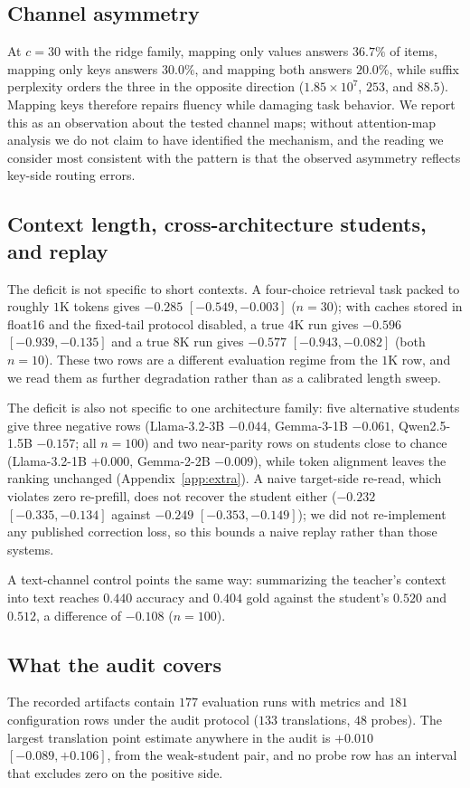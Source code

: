 \documentclass{article} %
\begin{document}
\subsection{Channel asymmetry}
At $c{=}30$ with the ridge family, mapping only values answers $36.7\%$ of
items, mapping only keys answers $30.0\%$, and mapping both answers $20.0\%$,
while suffix perplexity orders the three in the opposite direction
($1.85\times10^{7}$, $253$, and $88.5$). Mapping keys therefore repairs fluency
while damaging task behavior. We report this as an observation about the tested
channel maps; without attention-map analysis we do not claim to have identified
the mechanism, and the reading we consider most consistent with the pattern is
that the observed asymmetry reflects key-side routing errors.

\subsection{Context length, cross-architecture students, and replay}
The deficit is not specific to short contexts. A four-choice retrieval task
packed to roughly $1$K tokens gives $-0.285$ $[-0.549,-0.003]$ ($n{=}30$);
with caches stored in float16 and the fixed-tail protocol disabled, a true
$4$K run gives $-0.596$ $[-0.939,-0.135]$ and a true $8$K run gives $-0.577$
$[-0.943,-0.082]$ (both $n{=}10$). These two rows are a different evaluation
regime from the $1$K row, and we read them as further degradation rather than as
a calibrated length sweep.

The deficit is also not specific to one architecture family: five alternative
students give three negative rows (Llama-3.2-3B $-0.044$, Gemma-3-1B $-0.061$,
Qwen2.5-1.5B $-0.157$; all $n{=}100$) and two near-parity rows on students
close to chance (Llama-3.2-1B $+0.000$, Gemma-2-2B $-0.009$), while token
alignment leaves the ranking unchanged (Appendix~\ref{app:extra}). A naive
target-side re-read, which violates zero re-prefill, does not recover the
student either ($-0.232$ $[-0.335,-0.134]$ against $-0.249$ $[-0.353,-0.149]$);
we did not re-implement any published correction loss, so this bounds a naive
replay rather than those systems.

A text-channel control points the same way: summarizing the teacher's context
into text reaches $0.440$ accuracy and $0.404$ gold against the student's $0.520$
and $0.512$, a difference of $-0.108$ ($n{=}100$).

\subsection{What the audit covers}
The recorded artifacts contain $177$ evaluation runs with metrics and $181$
configuration rows under the audit protocol ($133$ translations, $48$ probes).
The largest translation point estimate anywhere in the audit is $+0.010$
$[-0.089,+0.106]$, from the weak-student pair, and no probe row has an interval
that excludes zero on the positive side.
\end{document}
